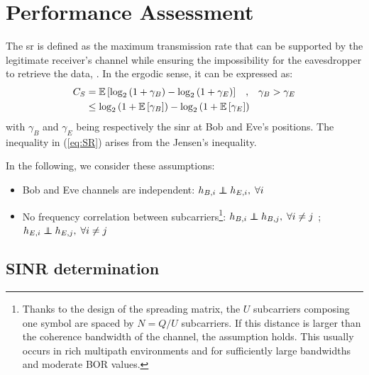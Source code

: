 \section{Performance Assessment} 
\label{sec:perf}
The \gls{sr} is defined as the maximum transmission rate that can be supported by the legitimate receiver's channel while ensuring the impossibility for the eavesdropper to retrieve the data, \cite{TR_Tran_secrecy_capa}. In the ergodic sense, it can be expressed as:
\begin{equation}
\begin{split}
    C_S &=  \mathbb{E} \left[\log_2{\left(1+\gamma_B\right)} - \log_2{\left(1+\gamma_E\right)}\right] \; \; \; , \; \; \;  \gamma_B > \gamma_E \\
    &\leq   \log_2 \left( 1+ \mathbb{E} \left[\gamma_B\right] \right) - \log_2 \left( 1+ \mathbb{E} \left[\gamma_E\right]\right) 
    \end{split}
    \label{eq:SR}
\end{equation}
with $\gamma_B$ and $\gamma_E$ being respectively the \gls{sinr} at Bob and Eve's positions. The inequality in (\ref{eq:SR}) arises from the Jensen's inequality. 


In the following, we consider these assumptions:
\begin{itemize}
    \item Bob and Eve channels are independent: $h_{B,i} \independent h_{E,i},\; \forall i$
    \item No frequency correlation between subcarriers\footnote{Thanks to the design of the spreading matrix, the $U$ subcarriers composing one symbol are spaced by $N = Q/U$ subcarriers. If this distance is larger than the coherence bandwidth of the channel, the assumption holds. This usually occurs in rich multipath environments and for sufficiently large bandwidths and moderate BOR values.}: $h_{B,i} \independent h_{B,j},\; \forall i\neq j$ ; $h_{E,i} \independent h_{E,j},\; \forall i\neq j$
\end{itemize}



\subsection{SINR determination}
